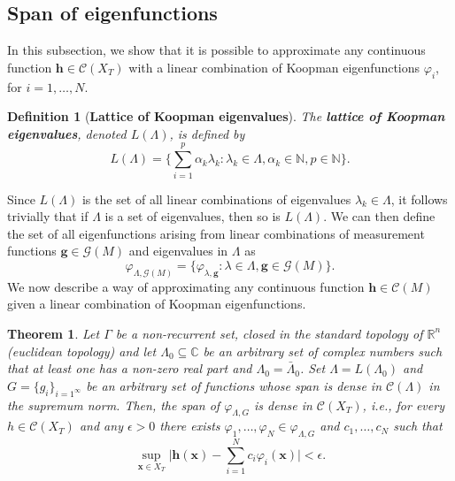 \documentclass[]{article}
\newtheorem{definition}{Definition}
\newtheorem{theorem}{Theorem}
\begin{document}
\subsection{Span of eigenfunctions}
In this subsection, we show that it is possible to approximate any continuous function $\textbf{h} \in \mathcal{C}(X_T)$ with a linear combination of Koopman eigenfunctions $\varphi_i$, for $i=1,\dots,N$.
\begin{definition}[\textbf{Lattice of Koopman eigenvalues}]
The \textbf{lattice of Koopman eigenvalues}, denoted $L(\Lambda)$, is defined by
\begin{equation}
	L(\Lambda) = \bigg\{\sum_{i=1}^p \alpha_k \lambda_k: \lambda_k \in \Lambda, \alpha_k \in \mathbb{N}, p \in \mathbb{N}\bigg\}.
\end{equation}
\end{definition}
Since $L(\Lambda)$ is the set of all linear combinations of eigenvalues $\lambda_k \in \Lambda$, it follows trivially that if $\Lambda$ is a set of eigenvalues, then so is $L(\Lambda)$. We can then define the set of all eigenfunctions arising from linear combinations of measurement functions $\textbf{g} \in \mathcal{G}(M)$ and eigenvalues in $\Lambda$ as
\begin{equation}
	\varphi_{\Lambda, \mathcal{G}(M)} = \{\varphi_{\lambda, \textbf{g}}: \lambda \in \Lambda, \textbf{g} \in \mathcal{G}(M)\}.
\end{equation}
We now describe a way of approximating any continuous function $\textbf{h} \in \mathcal{C}(M)$ given a linear combination of Koopman eigenfunctions.
\begin{theorem}
Let $\Gamma$ be a non-recurrent set, closed in the standard topology of $\mathbb{R}^n$ (euclidean topology) and let $\Lambda_0 \subseteq \mathbb{C}$ be an arbitrary set of complex numbers such that at least one has a non-zero real part and $\Lambda_0=\bar{\Lambda}_0$. Set $\Lambda = L(\Lambda_0)$ and $G=\{g_i\}_{i=1^{\infty}}$ be an arbitrary set of functions whose span is dense in $\mathcal{C}(\Lambda)$ in the supremum norm. Then, the span of $\varphi_{\Lambda, G}$ is dense in $\mathcal{C}(X_T)$, i.e., for every $h \in \mathcal{C}(X_T)$ and any $\epsilon > 0$ there exists $\varphi_1,\dots,\varphi_N \in \varphi_{\Lambda,G}$ and $c_1,\dots,c_N$ such that
\begin{equation}
	\sup_{\textbf{x} \in X_T} \bigg|\textbf{h}(\textbf{x})-\sum_{i=1}^N c_i \varphi_i(\textbf{x})\bigg| < \epsilon.
\end{equation}
\end{theorem}
\end{document}
